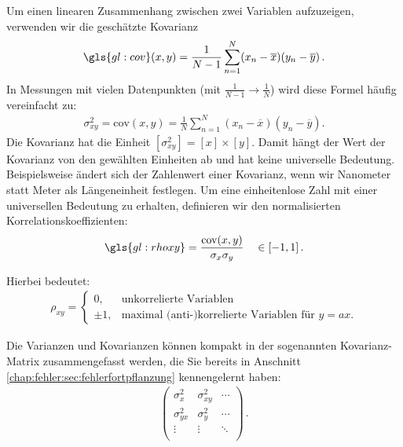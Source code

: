 Um einen linearen Zusammenhang zwischen zwei Variablen aufzuzeigen, verwenden wir die geschätzte Kovarianz
\begin{align}
\gls{gl:cov}(x,y) = \frac{1}{N - 1} \sum_{n = 1}^N (x_n - \overline{x})(y_n - \overline{y})\,.
\label{eq:Kovarianz}
\end{align}
In Messungen mit vielen Datenpunkten (mit $\frac{1}{N-1}\rightarrow \frac{1}{N}$) wird diese Formel häufig vereinfacht zu:
\begin{align}
\sigma_{xy}^2 = \text{cov}(x,y) = \frac{1}{N} \sum_{n = 1}^N (x_n - \overline{x})(y_n - \overline{y}).
\label{eq:Kovarianzsimple}
\end{align}
Die Kovarianz hat die Einheit $[\sigma_{xy}^2]=[x]\times[y]$. Damit hängt der Wert der Kovarianz von den gewählten Einheiten ab und hat keine universelle Bedeutung. Beispielsweise ändert sich der Zahlenwert einer Kovarianz, wenn wir Nanometer statt Meter als Längeneinheit festlegen. Um eine einheitenlose Zahl mit einer universellen Bedeutung zu erhalten, definieren wir den normalisierten Korrelationskoeffizienten:
\begin{align}
\gls{gl:rhoxy} = \frac{ \text{cov} (x,y) }{ \sigma_x \sigma_y } \quad \in [-1,1]\,.
\label{eq:Korrelationskoeffizient}
\end{align}

Hierbei bedeutet:
\begin{align}
\rho_{xy} = 
    \begin{cases}
        0,& \text{unkorrelierte Variablen}\\
        \pm 1,& \text{maximal (anti-)korrelierte Variablen für $y =  ax$.}
    \end{cases}       
\end{align}

Die Varianzen und Kovarianzen können kompakt in der sogenannten Kovarianz-Matrix zusammengefasst werden, die Sie bereits in Anschnitt \ref{chap:fehler:sec:fehlerfortpflanzung} kennengelernt haben:
\begin{align}
\begin{pmatrix}
\sigma_x^2    & \sigma_{xy}^2 & \cdots \\
\sigma_{yx}^2 & \sigma_y^2    & \cdots \\
\vdots        & \vdots        & \ddots \\
\end{pmatrix}\,.
\end{align}

